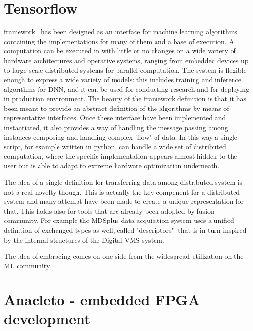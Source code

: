 %

\section{Tensorflow}

\Tensorflow framework~\cite{tensorflow2015-whitepaper} has been designed as an interface for machine learning algorithms containing the implementations for many of them and a base of execution. A computation can be executed in \Tensorflow with little or no changes on a wide variety of hardware architectures and operative systems, ranging from embedded devices up to large-scale distributed systems for parallel computation. The system is flexible enough to express a wide variety of models: this includes training and inference algorithms for \acs{DNN}, and it can be used for conducting research and for deploying in production environment. 
The beauty of the framework definition is that it has been meant to provide an abstract definition of the algorithms by means of representative interfaces. Once these interface have been implemented and instantiated, it also provides a way of handling the message passing among instances composing and handling complex "flow" of data. In this way a single script, for example written in python, can handle a wide set of distributed computation, where the specific implementation appears almost hidden to the user but is able to adapt to extreme hardware optimization underneath.

The idea of a single definition for transferring data among distributed system is not a real novelty though. This is actually the key component for a distributed system and many attempt have been made to create a unique representation for that. 
This holds also for tools that are already been adopted by fusion community. For example the MDSplus data acquisition system uses a unified definition of exchanged types as well, called "descriptors", that is in turn inspired by the internal structures of the Digital-VMS system.

The idea of embracing \Tensorflow comes on one side from the widespread utilization on the ML community



\section{Anacleto - embedded FPGA development}

